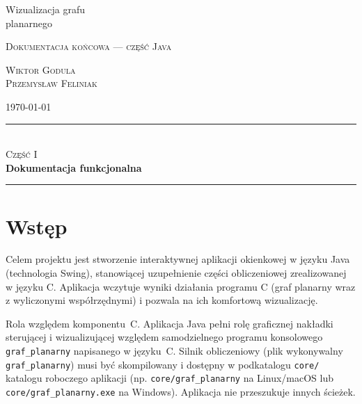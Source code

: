 \documentclass[a4paper, 11pt]{article}
\newcommand{\partpage}[2]{%
  \clearpage
  \thispagestyle{empty}
  \vspace*{6cm}
  \begin{center}
    {\color{rulegray}\rule{0.4\textwidth}{0.6pt}}\\[1em]
    {\fontsize{11}{13}\selectfont\scshape\color{rulegray}#1}\\[0.6em]
    {\fontsize{28}{34}\selectfont\bfseries\color{primary}#2}\\[1em]
    {\color{rulegray}\rule{0.4\textwidth}{0.6pt}}
  \end{center}
  \clearpage
}
\begin{document}
\begin{titlepage}
  \centering
  \vspace*{4cm}

  {\fontsize{32}{38}\selectfont Wizualizacja grafu\\planarnego}

  \vspace{0.8cm}

  {\large\scshape\color{rulegray} Dokumentacja końcowa --- część Java}

  \vspace{1.2cm}

  {\small\scshape Wiktor Godula\\ Przemysław Feliniak}

  \vfill

  {\small\color{rulegray} \today}
\end{titlepage}

\tableofcontents
\newpage


\partpage{Część I}{Dokumentacja funkcjonalna}

\section{Wst\k{e}p}

Celem projektu jest stworzenie interaktywnej aplikacji okienkowej w j\k{e}zyku Java (technologia Swing), stanowi\k{a}cej uzupe\l{}nienie cz\k{e}\'sci obliczeniowej zrealizowanej w j\k{e}zyku C. Aplikacja wczytuje wyniki dzia\l{}ania programu C (graf planarny wraz z wyliczonymi wsp\'o\l{}rz\k{e}dnymi) i pozwala na ich komfortow\k{a} wizualizacj\k{e}.

Rola wzgl\k{e}dem komponentu~C.
Aplikacja Java pe\l{}ni rol\k{e} graficznej nakładki steruj\k{a}cej i wizualizuj\k{a}cej wzgl\k{e}dem samodzielnego programu konsolowego \texttt{graf\_planarny} napisanego w j\k{e}zyku~C. Silnik obliczeniowy (plik wykonywalny \texttt{graf\_planarny}) musi by\'c skompilowany i dost\k{e}pny w podkatalogu \texttt{core/} katalogu roboczego aplikacji (np. \texttt{core/graf\_planarny} na Linux/macOS lub \texttt{core/graf\_planarny.exe} na Windows). Aplikacja nie przeszukuje innych ścieżek.
\end{document}
